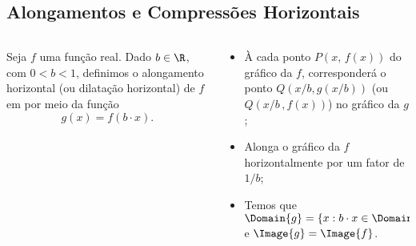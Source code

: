 \subsection{Alongamentos e Compressões Horizontais}
\begin{frame}
  \begin{columns}[onlytextwidth]
    \begin{column}{0.49\textwidth}\vspace*{-0.5cm}
      \begin{definition}
        Seja $f$ uma função real. Dado $b\in\R$, com $0<b<1$, definimos o alongamento horizontal (ou dilatação horizontal) de $f$ em por meio da função
        \begin{equation*}
          g(x) = f(b\cdot x).
        \end{equation*}
      \end{definition}
    \end{column}
    \begin{column}{0.49\textwidth}\vspace*{-0.6cm}
      \begin{itemize}
        \item À cada ponto $P(x,\,f(x))$ do gráfico da $f$, corresponderá o ponto $Q(x/b,g(x/b))$ (ou $Q\left(x/b\,,f(x)\right)$) no gráfico da $g$;
        \item Alonga o gráfico da $f$ horizontalmente por um fator de $1/b$;
        \item Temos que $\Domain{g} = \{x:b\cdot x\in\Domain{f}\}$ e $\Image{g}=\Image{f}$.
      \end{itemize}
    \end{column}
  \end{columns}
  \begin{figure}
  \end{figure}
\end{frame}

